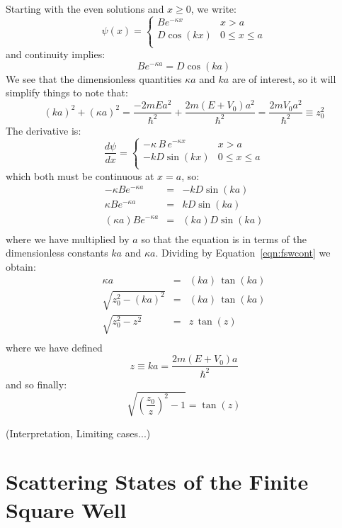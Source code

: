 \documentclass[12pt]{book}
\begin{document}
Starting with the even solutions and $x\geq0$, we write:
$$\psi(x) = \begin{cases}
Be^{\displaystyle -\kappa x} & x > a \\
D \cos(kx) & 0 \leq x \leq a \\
\end{cases}$$
and continuity implies:
\begin{equation}
\label{eqn:fswcont}
B e^{-\kappa a} = D \cos(ka)
\end{equation}
We see that the dimensionless quantities $\kappa a$ and $ka$ are of interest, so it will simplify things to note that:
$$(ka)^2+(\kappa a)^2 = \frac{-2mEa^2}{\hbar^2} + \frac{2m(E+V_0)a^2}{\hbar^2} = 
\frac{2mV_0a^2}{\hbar^2} \equiv z_0^2$$
The derivative is:
$$\frac{d\psi}{dx} = \begin{cases}
-\kappa \, B \, e^{\displaystyle -\kappa x} & x > a \\
-kD \sin(kx) & 0 \leq x \leq a \\
\end{cases}$$
which both must be continuous at $x=a$, so:
\begin{eqnarray*}
-\kappa B e^{-\kappa a} &=& -k D \sin(ka)\\
 \kappa B e^{-\kappa a} &=& k D \sin(ka)\\
 (\kappa a) B e^{-\kappa a} &=& (ka) D \sin(ka)\\
\end{eqnarray*}
where we have multiplied by $a$ so that the equation is in terms of the dimensionless constants $ka$ and $\kappa a$.  Dividing by Equation~\ref{eqn:fswcont} we obtain:
\begin{eqnarray*}
\kappa a &=& (ka) \, \tan(ka) \\
\sqrt{z_0^2-(ka)^2} &=& (ka) \, \tan(ka) \\
\sqrt{z_0^2-z^2} &=& z \, \tan(z) \\
\end{eqnarray*}
where we have defined 
$$z \equiv ka = \frac{2m(E+V_0)a}{\hbar^2}$$
and so finally:
\begin{equation}
\sqrt{\left(\frac{z_0}{z}\right)^2-1} = \tan(z) 
\end{equation}

(Interpretation, Limiting cases...)

\section{Scattering States of the Finite Square Well}
\end{document}
